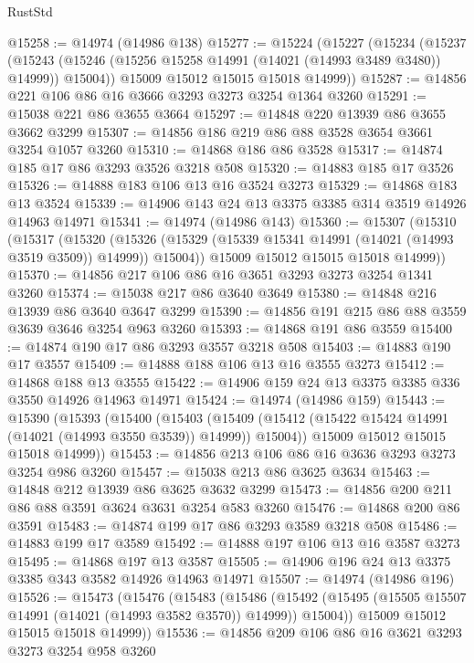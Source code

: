 \begin{lexlean}{RustStd}
\begin{coremodule}
@15258 := @14974 (@14986 @138)
@15277 := @15224
    (@15227
      (@15234
        (@15237
          (@15243 (@15246 (@15256 @15258 @14991 (@14021 (@14993 @3489 @3480)) @14999)) @15004))
        @15009
        @15012
        @15015
        @15018
        @14999))
@15287 := @14856 @221 @106 @86 @16 @3666 @3293 @3273 @3254 @1364 @3260
@15291 := @15038 @221 @86 @3655 @3664
@15297 := @14848 @220 @13939 @86 @3655 @3662 @3299
@15307 := @14856 @186 @219 @86 @88 @3528 @3654 @3661 @3254 @1057 @3260
@15310 := @14868 @186 @86 @3528
@15317 := @14874 @185 @17 @86 @3293 @3526 @3218 @508
@15320 := @14883 @185 @17 @3526
@15326 := @14888 @183 @106 @13 @16 @3524 @3273
@15329 := @14868 @183 @13 @3524
@15339 := @14906 @143 @24 @13 @3375 @3385 @314 @3519 @14926 @14963 @14971
@15341 := @14974 (@14986 @143)
@15360 := @15307
    (@15310
      (@15317
        (@15320
          (@15326 (@15329 (@15339 @15341 @14991 (@14021 (@14993 @3519 @3509)) @14999)) @15004))
        @15009
        @15012
        @15015
        @15018
        @14999))
@15370 := @14856 @217 @106 @86 @16 @3651 @3293 @3273 @3254 @1341 @3260
@15374 := @15038 @217 @86 @3640 @3649
@15380 := @14848 @216 @13939 @86 @3640 @3647 @3299
@15390 := @14856 @191 @215 @86 @88 @3559 @3639 @3646 @3254 @963 @3260
@15393 := @14868 @191 @86 @3559
@15400 := @14874 @190 @17 @86 @3293 @3557 @3218 @508
@15403 := @14883 @190 @17 @3557
@15409 := @14888 @188 @106 @13 @16 @3555 @3273
@15412 := @14868 @188 @13 @3555
@15422 := @14906 @159 @24 @13 @3375 @3385 @336 @3550 @14926 @14963 @14971
@15424 := @14974 (@14986 @159)
@15443 := @15390
    (@15393
      (@15400
        (@15403
          (@15409 (@15412 (@15422 @15424 @14991 (@14021 (@14993 @3550 @3539)) @14999)) @15004))
        @15009
        @15012
        @15015
        @15018
        @14999))
@15453 := @14856 @213 @106 @86 @16 @3636 @3293 @3273 @3254 @986 @3260
@15457 := @15038 @213 @86 @3625 @3634
@15463 := @14848 @212 @13939 @86 @3625 @3632 @3299
@15473 := @14856 @200 @211 @86 @88 @3591 @3624 @3631 @3254 @583 @3260
@15476 := @14868 @200 @86 @3591
@15483 := @14874 @199 @17 @86 @3293 @3589 @3218 @508
@15486 := @14883 @199 @17 @3589
@15492 := @14888 @197 @106 @13 @16 @3587 @3273
@15495 := @14868 @197 @13 @3587
@15505 := @14906 @196 @24 @13 @3375 @3385 @343 @3582 @14926 @14963 @14971
@15507 := @14974 (@14986 @196)
@15526 := @15473
    (@15476
      (@15483
        (@15486
          (@15492 (@15495 (@15505 @15507 @14991 (@14021 (@14993 @3582 @3570)) @14999)) @15004))
        @15009
        @15012
        @15015
        @15018
        @14999))
@15536 := @14856 @209 @106 @86 @16 @3621 @3293 @3273 @3254 @958 @3260

\end{coremodule}
\end{lexlean}
